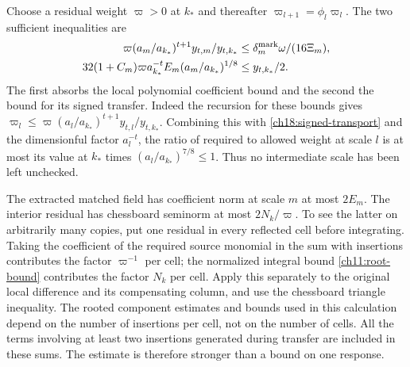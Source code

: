 Choose a residual weight $\varpi>0$ at $k_*$ and thereafter
$\varpi_{l+1}=\phi_l\varpi_l$. The two sufficient inequalities are
\begin{align}
 \varpi(a_m/a_{k_*})^{t+1}y_{t,m}/y_{t,k_*}
        &\le\delta_m^{\rm mark}\omega/(16\Xi_m),\notag\\
 32(1+C_m)\varpi a_{k_*}^{-t}E_m(a_m/a_{k_*})^{1/8}
        &\le y_{t,k_*}/2.
 \label{ch18:residual-weights}
\end{align}
The first absorbs the local polynomial coefficient bound and the second the bound for its signed transfer.
Indeed the recursion for these bounds gives
$\varpi_l\le\varpi(a_l/a_{k_*})^{t+1}y_{t,l}/y_{t,k_*}$.
Combining this with \eqref{ch18:signed-transport} and the dimensionful
factor $a_l^{-t}$, the ratio of required to allowed weight at
scale $l$ is at most its value at $k_*$ times
$(a_l/a_{k_*})^{7/8}\le1$. Thus no intermediate scale has been
left unchecked.

The extracted matched field has coefficient norm at scale $m$
at most $2E_m$. The interior residual has chessboard seminorm
at most $2N_k/\varpi$. To see the latter on arbitrarily many
copies, put one residual in every reflected cell before integrating.
Taking the coefficient of the required source monomial in the sum with insertions contributes the factor $\varpi^{-1}$ per
cell; the normalized integral bound \eqref{ch11:root-bound}
contributes the factor $N_k$ per cell. Apply this separately to the original local
difference and its compensating column, and use the chessboard
triangle inequality. The rooted component estimates and bounds
used in this calculation depend on the number of insertions per cell, not on the
number of cells. All the terms involving at least two insertions generated during transfer
are included in these sums. The estimate is therefore stronger
than a bound on one response.

